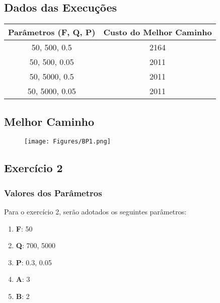 \documentclass[hidelinks,12pt]{article}
\begin{document}
	
	
	\subsection{Dados das Execuções}
	\begin{table}[!h]
	\centering
		\begin{tabular}{|c|c|}
		\hline
		\multicolumn{1}{|c|}{Parâmetros (F, Q, P)} & \multicolumn{1}{|c|}{Custo do Melhor Caminho} \\ \hline
		50, 500, 0.5                               &         2164                                     \\ \hline
		50, 500, 0.05                              &         2011                                     \\ \hline
		50, 5000, 0.5                              &         2011                                     \\ \hline
		50, 5000, 0.05                             &         2011                                     \\ \hline
		\end{tabular}
	\end{table}
	
	\subsection{Melhor Caminho}
	
			\begin{figure}[!h]
				\centering
				\texttt{[image: Figures/BP1.png]}
			\end{figure}
				
		
		
\subsection{Exercício 2}
		
	
		\subsubsection{Valores dos Parâmetros}	
		Para o exercício 2, serão adotados os seguintes parâmetros:
		
		\begin{enumerate}
			\item \textbf{F}: 50
			\item \textbf{Q}: 700, 5000
			\item \textbf{P}: 0.3, 0.05
			\item \textbf{A}:  3
			\item \textbf{B}:  2		
		\end{enumerate}
		
\end{document}
